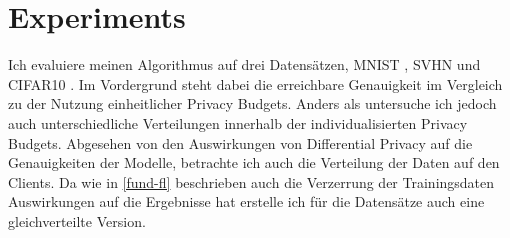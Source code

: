 \chapter{Experiments}\label{chap:experiments}

Ich evaluiere meinen Algorithmus auf drei Datensätzen, MNIST \cite{lecun:1998}, SVHN \cite{netzer:2011} und CIFAR10 \cite{krizhevsky:2009}. Im Vordergrund steht dabei die erreichbare Genauigkeit im Vergleich zu der Nutzung einheitlicher Privacy Budgets. Anders als \textcite{aldaghri:2023} untersuche ich jedoch auch unterschiedliche Verteilungen innerhalb der individualisierten Privacy Budgets. Abgesehen von den Auswirkungen von Differential Privacy auf die Genauigkeiten der Modelle, betrachte ich auch die Verteilung der Daten auf den Clients. Da wie in \autoref{fund-fl} beschrieben auch die Verzerrung der Trainingsdaten Auswirkungen auf die Ergebnisse hat erstelle ich für die Datensätze auch eine gleichverteilte Version.


